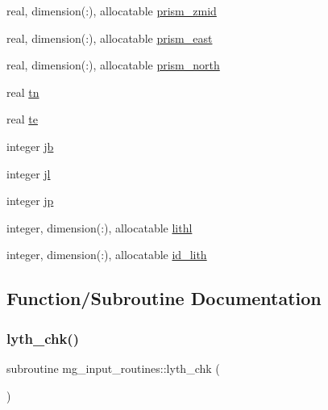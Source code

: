 \begin{DoxyCompactItemize}
real, dimension(\+:), allocatable \hyperlink{namespacemg__input__routines_aa765051314dcfacd6dc6e2c1ea17ed04}{prism\+\_\+zmid}
\item 
real, dimension(\+:), allocatable \hyperlink{namespacemg__input__routines_a3b79964f71670b4e30aa6d0879c4fd28}{prism\+\_\+east}
\item 
real, dimension(\+:), allocatable \hyperlink{namespacemg__input__routines_a45032fedf20c6d2a1f01df582b86333a}{prism\+\_\+north}
\item 
real \hyperlink{namespacemg__input__routines_aca72cc45f4f3c7ec515d367a2a6ee659}{tn}
\item 
real \hyperlink{namespacemg__input__routines_a851abd44c498519b419cf1ccdab8640f}{te}
\item 
integer \hyperlink{namespacemg__input__routines_ad6477edd6c31520d925c6962ec2a7248}{jb}
\item 
integer \hyperlink{namespacemg__input__routines_ac9c41f20a75b4f15a95c79ffcbf655db}{jl}
\item 
integer \hyperlink{namespacemg__input__routines_a03f300f92ef7ffa2899bc4a7623805e6}{jp}
\item 
integer, dimension(\+:), allocatable \hyperlink{namespacemg__input__routines_a5bfda764a44cea47087fc53cd4d756d0}{lithl}
\item 
integer, dimension(\+:), allocatable \hyperlink{namespacemg__input__routines_a32db71951a8a9e2fd94dd117598cdeb6}{id\+\_\+lith}
\end{DoxyCompactItemize}


\subsection{Function/\+Subroutine Documentation}
\mbox{\label{namespacemg__input__routines_a9e1339657e87110a735f9631657c9019}} 
\subsubsection{\texorpdfstring{lyth\+\_\+chk()}{lyth\_chk()}}
{\footnotesize\ttfamily subroutine mg\+\_\+input\+\_\+routines\+::lyth\+\_\+chk (\begin{DoxyParamCaption}{ }\end{DoxyParamCaption})}

